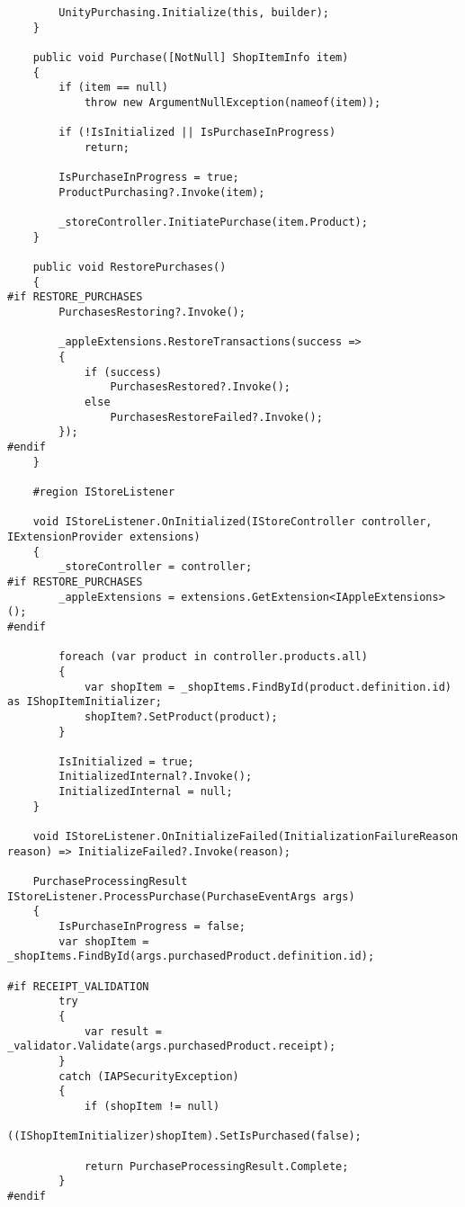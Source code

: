 \begin{lstlisting}
        UnityPurchasing.Initialize(this, builder);
    }

    public void Purchase([NotNull] ShopItemInfo item)
    {
        if (item == null)
            throw new ArgumentNullException(nameof(item));

        if (!IsInitialized || IsPurchaseInProgress)
            return;

        IsPurchaseInProgress = true;
        ProductPurchasing?.Invoke(item);

        _storeController.InitiatePurchase(item.Product);
    }

    public void RestorePurchases()
    {
#if RESTORE_PURCHASES
        PurchasesRestoring?.Invoke();

        _appleExtensions.RestoreTransactions(success =>
        {
            if (success)
                PurchasesRestored?.Invoke();
            else
                PurchasesRestoreFailed?.Invoke();
        });
#endif
    }

    #region IStoreListener

    void IStoreListener.OnInitialized(IStoreController controller, IExtensionProvider extensions)
    {
        _storeController = controller;
#if RESTORE_PURCHASES
        _appleExtensions = extensions.GetExtension<IAppleExtensions>();
#endif

        foreach (var product in controller.products.all)
        {
            var shopItem = _shopItems.FindById(product.definition.id) as IShopItemInitializer;
            shopItem?.SetProduct(product);
        }

        IsInitialized = true;
        InitializedInternal?.Invoke();
        InitializedInternal = null;
    }

    void IStoreListener.OnInitializeFailed(InitializationFailureReason reason) => InitializeFailed?.Invoke(reason);

    PurchaseProcessingResult IStoreListener.ProcessPurchase(PurchaseEventArgs args)
    {
        IsPurchaseInProgress = false;
        var shopItem = _shopItems.FindById(args.purchasedProduct.definition.id);

#if RECEIPT_VALIDATION
        try
        {
            var result = _validator.Validate(args.purchasedProduct.receipt);
        }
        catch (IAPSecurityException)
        {
            if (shopItem != null)
                ((IShopItemInitializer)shopItem).SetIsPurchased(false);

            return PurchaseProcessingResult.Complete;
        }
#endif


\end{lstlisting}
